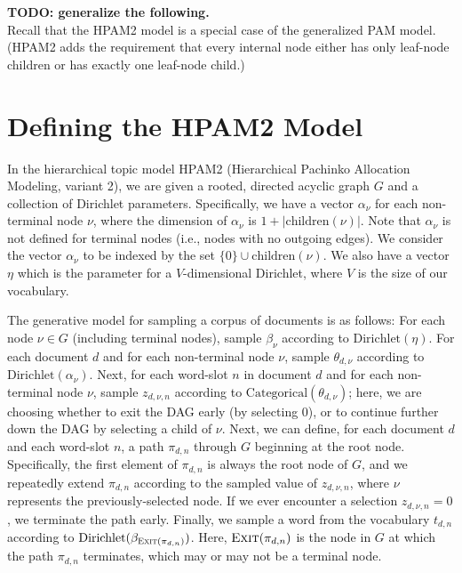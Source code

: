 \documentclass{article}
\theoremstyle{definition}
\newcommand{\Exit}{\textsc{Exit}}
\begin{document}

\clearpage

{\bf TODO: generalize the following.} \\
Recall that the HPAM2 model is a special case of the generalized PAM model.
(HPAM2 adds the requirement that every internal node either has only leaf-node children or has exactly one leaf-node child.)

\section{Defining the HPAM2 Model}

In the hierarchical topic model HPAM2 (Hierarchical Pachinko Allocation Modeling, variant 2), we are given a rooted, directed acyclic graph $G$ and a collection of Dirichlet parameters.
Specifically, we have a vector $\alpha_\nu$ for each non-terminal node $\nu$, where the dimension of $\alpha_\nu$ is $1 + |\text{children}(\nu)|$.
Note that $\alpha_\nu$ is not defined for terminal nodes (i.e., nodes with no outgoing edges).
We consider the vector $\alpha_\nu$ to be indexed by the set $\{0\} \cup \text{children}(\nu)$.
We also have a vector $\eta$ which is the parameter for a $V$-dimensional Dirichlet, where $V$ is the size of our vocabulary.

The generative model for sampling a corpus of documents is as follows:
For each node $\nu \in G$ (including terminal nodes), sample $\beta_\nu$ according to $\text{Dirichlet}(\eta)$.
For each document $d$ and for each non-terminal node $\nu$, sample $\theta_{d,\nu}$ according to $\text{Dirichlet}(\alpha_\nu)$.
Next, for each word-slot $n$ in document $d$ and for each non-terminal node $\nu$, sample $z_{d,\nu,n}$ according to $\text{Categorical}(\theta_{d,\nu})$; here, we are choosing whether to exit the DAG early (by selecting $0$), or to continue further down the DAG by selecting a child of $\nu$.
Next, we can define, for each document $d$ and each word-slot $n$, a path $\pi_{d,n}$ through $G$ beginning at the root node.
Specifically, the first element of $\pi_{d,n}$ is always the root node of $G$, and we repeatedly extend $\pi_{d,n}$ according to the sampled value of $z_{d,\nu,n}$, where $\nu$ represents the previously-selected node.
If we ever encounter a selection $z_{d,\nu,n} = 0$, we terminate the path early.
Finally, we sample a word from the vocabulary $t_{d,n}$ according to $\text{Dirichlet}(\beta_{\Exit(\pi_{d,n})})$.
Here, $\Exit(\pi_{d,n})$ is the node in $G$ at which the path $\pi_{d,n}$ terminates, which may or may not be a terminal node.
\end{document}
